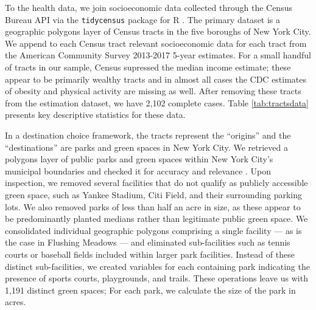 \documentclass[shortAfour,sageh.bst]{sagej}
\begin{document}
To the health data, we join socioeconomic data collected through the
Census Bureau API via the \texttt{tidycensus} package for R
\citep{Walker2019}. The primary dataset is a geographic polygons layer
of Census tracts in the five boroughs of New York City. We append to
each Census tract relevant socioeconomic data for each tract from the
American Community Survey 2013-2017 5-year estimates. For a small
handful of tracts in our sample, Census supressed the median income
estimate; these appear to be primarily wealthy tracts and in almost all
cases the CDC estimates of obesity and physical activity are missing as
well. After removing these tracts from the estimation dataset, we have
2,102 complete cases. Table \ref{tab:tractsdata} presents key
descriptive statistics for these data.

In a destination choice framework, the tracts represent the ``origins''
and the ``destinations'' are parks and green spaces in New York City. We
retrieved a polygons layer of public parks and green spaces within New
York City's municipal boundaries and checked it for accuracy and
relevance \citep{nycparks}. Upon inspection, we removed several
facilities that do not qualify as publicly accessible green space, such
as Yankee Stadium, Citi Field, and their surrounding parking lots. We
also removed parks of less than half an acre in size, as these appear to
be predominantly planted medians rather than legitimate public green
space. We consolidated individual geographic polygons comprising a
single facility --- as is the case in Flushing Meadows --- and
eliminated sub-facilities such as tennis courts or baseball fields
included within larger park facilities. Instead of these distinct
sub-facilities, we created variables for each containing park indicating
the presence of sports courts, playgrounds, and trails. These operations
leave us with 1,191 distinct green spaces; For each park, we calculate
the size of the park in acres.
\end{document}
